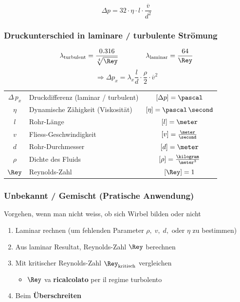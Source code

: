 \[\boxed{ \Delta p = 32 \cdot \eta \cdot l \cdot \frac{\overline{v}}{d^2} }  \]


\subsubsection{Druckunterschied in laminare / turbulente Strömung}

\[\lambda_{\rm turbulent} = \frac{0.316}{\sqrt[4]{\Rey}}  \qquad \qquad \lambda_{\rm laminar} = \frac{64}{\Rey} \]
\[\boxed{ \Rightarrow \Delta p_x = \lambda_x \frac{l}{d} \cdot \frac{\rho}{2} \cdot \overline{v}^2 } \]


\begin{tabular}{c l c}
    $\Delta \, p_x$ & Druckdifferenz (laminar / turbulent)  & $[\Delta p] = \pascal$                \\
    $\eta$          & Dynamische Zähigkeit (Viskosität)     & $[\eta] = \pascal \, \second$         \\
    $l$             & Rohr-Länge                            & $[l] = \meter$                        \\
    $v$             & Fliess-Geschwindigkeit                & $[v] = \frac{\meter}{\second}$        \\
    $d$             & Rohr-Durchmesser                      & $[d] = \meter$                        \\		
    $\rho$          & Dichte des Fluids                     & $[\rho] = \frac{\kilogram}{\meter^3}$ \\
    $\Rey$          & Reynolds-Zahl                         & $[\Rey] = 1$
\end{tabular}


\subsubsection*{Unbekannt / Gemischt (Pratische Anwendung)}

Vorgehen, wenn man nicht weiss, ob sich Wirbel bilden oder nicht

\smallskip

\begin{enumerate}
    \item Laminar rechnen (um fehlenden Parameter $\rho, \; v, \; d, \text{ oder } \eta$ zu bestimmen) 
    \item Aus laminar Resultat, Reynolds-Zahl $\Rey$ berechnen
    \item Mit kritischer Reynolds-Zahl $\Rey_{\rm kritisch}$ vergleichen
    \begin{itemize}
        \item $\Rey$ va \textbf{ricalcolato} per il regime turbolento
    \end{itemize}
    \item Beim \textbf{Überschreiten} \textrightarrow\ 
\end{enumerate}


